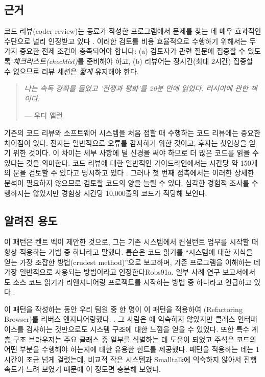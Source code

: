 \documentclass[a4paper,10pt,twoside]{book}
\begin{document}
\subsection*{근거}

코드 리뷰(coder review)는 동료가 작성한 프로그램에서 문제를 찾는 데 매우 효과적인 수단으로 널리 인정받고 있다 \cite{Gilb93a} \cite{Glass97a}. 이러한 검토를 비용 효율적으로 수행하기 위해서는 두 가지 중요한 전제 조건이 충족되어야 합니다: (a) 검토자가 관련 질문에 집중할 수 있도록 \emph{체크리스트(checklist)}를 준비해야 하고, (b) 리뷰어는 장시간(최대 2시간) 집중할 수 없으므로 리뷰 세션은 \emph{짧게} 유지해야 한다.

\begin{quotation}
\noindent
\emph{나는 속독 강좌를 들었고 '전쟁과 평화'를 20분 만에 읽었다. 러시아에 관한 책이다.}

\hfill --- 우디 앨런
\end{quotation}

기존의 코드 리뷰와 소프트웨어 시스템을 처음 접할 때 수행하는 코드 리뷰에는 중요한 차이점이 있다. 전자는 일반적으로 오류를 감지하기 위한 것이고, 후자는 첫인상을 얻기 위한 것이다. 이 차이는 세부 사항에 덜 신경을 써야 하므로 더 많은 코드를 읽을 수 있다는 것을 의미한다. 코드 리뷰에 대한 일반적인 가이드라인에서는 시간당 약 150개의 문을 검토할 수 있다고 명시하고 있다 \cite{Barn94a}. 그러나 첫 번째 접촉에서는 이러한 상세한 분석이 필요하지 않으므로 검토할 코드의 양을 늘릴 수 있다. 심각한 경험적 조사를 수행하지는 않았지만 경험상 시간당 10,000줄의 코드가 적당해 보인다.

\subsection*{알려진 용도}

이 패턴은 켄트 벡이 제안한 것으로, 그는 기존 시스템에서 컨설턴트 업무를 시작할 때 항상 적용하는 기법 중 하나라고 말했다. 롭슨은 코드 읽기를 ``시스템에 대한 지식을 얻는 가장 조잡한 방법(crudest method)''으로 보고하며, 기존 프로그램을 이해하는 데 가장 일반적으로 사용되는 방법이라고 인정한다{Robs91a}. 일부 사례 연구 보고서에서도 소스 코드 읽기가 리엔지니어링 프로젝트를 시작하는 방법 중 하나라고 언급하고 있다 \cite{Bray95a} \cite{Jack00a}.

이 패턴을 작성하는 동안 우리 팀원 중 한 명이 이 패턴을 적용하여 (Refactoring Browser)를 리버스 엔지니어링했다. \cite{Robe97a}. 그 사람은 에 익숙하지 않았지만 클래스 인터페이스를 검사하는 것만으로도 시스템 구조에 대한 느낌을 얻을 수 있었다. 또한 특수 계층 구조 브라우저는 주요 클래스 중 일부를 식별하는 데 도움이 되었고 주석은 코드의 어떤 부분을 수행해야 하는지에 대한 유용한 힌트를 제공했다. 패턴을 적용하는 데는 1시간이 조금 넘게 걸렸는데, 비교적 작은 시스템과 Smalltalk에 익숙하지 않아서 진행 속도가 느려 보였기 때문에 이 정도면 충분해 보였다.
\end{document}
